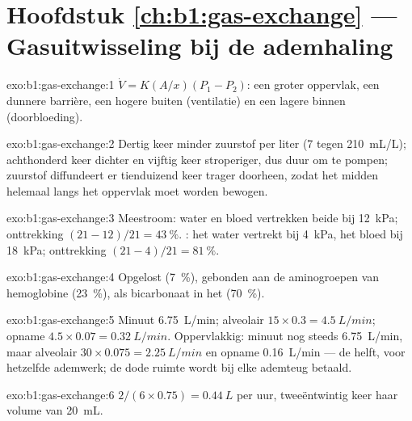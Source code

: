 \section*{Hoofdstuk \ref{ch:b1:gas-exchange} --- Gasuitwisseling bij de ademhaling}

\begin{solution}{exo:b1:gas-exchange:1}
$\dot V = K(A/x)(P_1 - P_2)$: een groter oppervlak, een dunnere barrière,
een hogere  buiten (ventilatie) en een lagere binnen
(doorbloeding).
\end{solution}

\begin{solution}{exo:b1:gas-exchange:2}
Dertig keer minder zuurstof per liter (\qty{7}{} tegen \qty{210}{mL/L});
achthonderd keer dichter en vijftig keer stroperiger, dus duur om te
pompen; zuurstof diffundeert er tienduizend keer trager doorheen, zodat
het midden helemaal langs het oppervlak moet worden bewogen.
\end{solution}

\begin{solution}{exo:b1:gas-exchange:3}
Meestroom: water en bloed vertrekken beide bij \qty{12}{kPa}; onttrekking
$(21 - 12)/21 = \qty{43}{\%}$. : het water vertrekt bij
\qty{4}{kPa}, het bloed bij \qty{18}{kPa}; onttrekking $(21 - 4)/21 =
\qty{81}{\%}$.
\end{solution}

\begin{solution}{exo:b1:gas-exchange:4}
Opgelost (\qty{7}{\%}), gebonden aan de aminogroepen van hemoglobine
(\qty{23}{\%}), als bicarbonaat in het  (\qty{70}{\%}).
\end{solution}

\begin{solution}{exo:b1:gas-exchange:5}
Minuut \qty{6.75}{L/min}; alveolair $15\times 0.3 = \qty{4.5}{L/min}$;
opname $4.5\times 0.07 = \qty{0.32}{L/min}$. Oppervlakkig: minuut nog
steeds \qty{6.75}{L/min}, maar alveolair $30\times 0.075 =
\qty{2.25}{L/min}$ en opname \qty{0.16}{L/min} --- de helft, voor
hetzelfde ademwerk; de dode ruimte wordt bij elke ademteug betaald.
\end{solution}

\begin{solution}{exo:b1:gas-exchange:6}
$2/(6\times 0.75) = \qty{0.44}{L}$ per uur, tweeëntwintig keer haar
volume van \qty{20}{mL}.
\end{solution}

